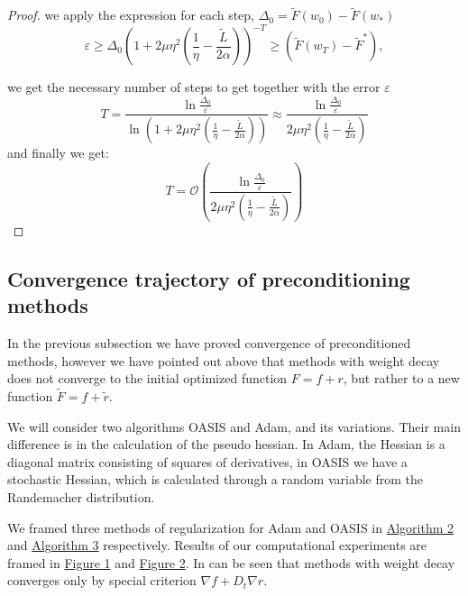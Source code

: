 \documentclass{article}
\begin{document}
\begin{proof}
    we apply the expression for each step, $\Delta_0 = \tilde{F}(w_0) - \tilde{F}(w_{*})$
    \begin{equation*}
    \varepsilon \ge \Delta_0 \left( 1 +  2 \mu \eta^2(\frac{1}{\eta} - \frac{\tilde{L}}{2 \alpha}) \right)^{-T} \ge (\tilde{F}(w_{T}) - \tilde{F}^*),     
    \end{equation*}
    
    we get the necessary number of steps to get together with the error $\varepsilon$
    \begin{equation*}
    T = \frac{\ln \frac{\Delta_0}{\varepsilon}}{\ln(1 + 2 \mu \eta^2(\frac{1}{\eta} - \frac{\tilde{L}}{2 \alpha}))} \approx \frac{\ln \frac{\Delta_0}{\varepsilon}}{2 \mu \eta^2(\frac{1}{\eta} - \frac{\tilde{L}}{2 \alpha})}
    \end{equation*}
    and finally we get:
    \begin{equation*}
    T =  \mathcal{O}\left( \frac{\ln \frac{\Delta_0}{\varepsilon}}{2 \mu \eta^2(\frac{1}{\eta} - \frac{\tilde{L}}{2 \alpha})} \right)
    \end{equation*}
\end{proof}

\subsection{Convergence trajectory of preconditioning methods}

 In the previous subsection we have proved convergence of preconditioned methods, however we have pointed out above that methods with weight decay does not converge to the initial optimized function $F = f + r$, but rather to a new function $\tilde{F} = f + \tilde{r}$.

We will consider two algorithms OASIS and Adam, and its variations. Their main difference is in the calculation of the pseudo hessian.
In Adam, the Hessian is a diagonal matrix consisting of squares of derivatives, in OASIS we have a stochastic Hessian, which is calculated through a random variable from the Randemacher distribution. 

We framed three methods of regularization for Adam and OASIS in \hyperref[alg:genAdam]{Algorithm 2} and \hyperref[alg:OASIS]{Algorithm 3} respectively.
Results of our computational experiments are framed in \hyperref[fig:adams_error]{Figure 1} and \hyperref[fig:oasis_error]{Figure 2}.
In can be seen that methods with weight decay converges only by special criterion $\nabla f + D_t \nabla r$.
\end{document}
